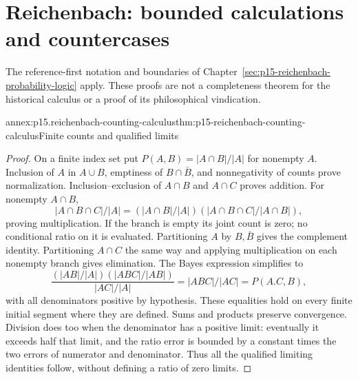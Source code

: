 \section{Reichenbach: bounded calculations and countercases}
\label{sec:annex-p15-reichenbach-probability-logic}

The reference-first notation and boundaries of
Chapter~\ref{sec:p15-reichenbach-probability-logic} apply. These
proofs are not a completeness theorem for the historical calculus
or a proof of its philosophical vindication.

\begin{annexitem}{annex:p15.reichenbach-counting-calculus}{thm:p15-reichenbach-counting-calculus}{Finite counts and qualified limits}
\begin{proof}
On a finite index set put \(P(A,B)=|A\cap B|/|A|\) for
nonempty \(A\). Inclusion of \(A\) in \(A\cup B\),
emptiness of \(B\cap\bar B\), and nonnegativity of counts
prove normalization. Inclusion--exclusion of \(A\cap B\) and
\(A\cap C\) proves addition. For nonempty \(A\cap B\),
\[
 |A\cap B\cap C|/|A|
 =(|A\cap B|/|A|)(|A\cap B\cap C|/|A\cap B|),
\]
proving multiplication. If the branch is empty its joint count is zero;
no conditional ratio on it is evaluated. Partitioning \(A\) by
\(B,\bar B\) gives the complement identity. Partitioning
\(A\cap C\) the same way and applying multiplication on each
nonempty branch gives elimination. The Bayes expression simplifies to
\[
 \frac{(|AB|/|A|)(|ABC|/|AB|)}{|AC|/|A|}
 =|ABC|/|AC|=P(A.C,B),
\]
with all denominators positive by hypothesis.
These equalities hold on every finite initial segment where they are
defined. Sums and products preserve convergence. Division does too
when the denominator has a positive limit: eventually it exceeds half
that limit, and the ratio error is bounded by a constant times the
two errors of numerator and denominator. Thus all the qualified
limiting identities follow, without defining a ratio of zero limits.
\end{proof}
\end{annexitem}

